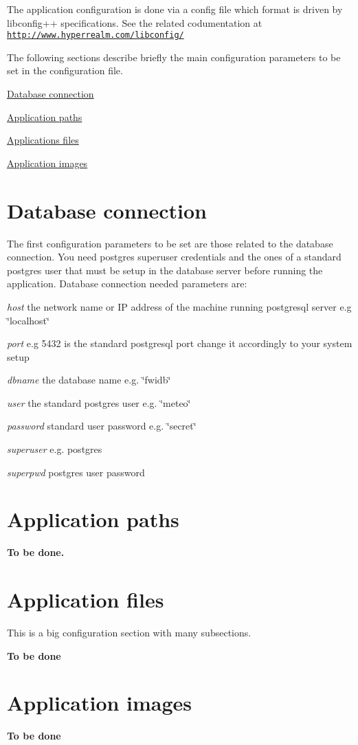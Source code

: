 The application configuration is done via a config file which format is driven by libconfig++ specifications. See the related codumentation at \href{http://www.hyperrealm.com/libconfig/}{\tt http\-://www.\-hyperrealm.\-com/libconfig/}

The following sections describe briefly the main configuration parameters to be set in the configuration file.


\begin{DoxyItemize}
\item \hyperlink{db_connection_config}{Database connection}
\item \hyperlink{application_paths}{Application paths}
\item \hyperlink{application_files}{Applications files}
\item \hyperlink{application_images}{Application images} 
\end{DoxyItemize}\hypertarget{db_connection_config}{}\section{Database connection}\label{db_connection_config}
The first configuration parameters to be set are those related to the database connection. You need postgres superuser credentials and the ones of a standard postgres user that must be setup in the database server before running the application. Database connection needed parameters are\-:


\begin{DoxyItemize}
\item {\itshape host} the network name or I\-P address of the machine running postgresql server e.\-g \char`\"{}localhost\char`\"{} 
\item {\itshape port} e.\-g 5432 is the standard postgresql port change it accordingly to your system setup 
\item {\itshape dbname} the database name e.\-g. \char`\"{}fwidb\char`\"{} 
\item {\itshape user} the standard postgres user e.\-g. \char`\"{}meteo\char`\"{} 
\item {\itshape password} standard user password e.\-g. \char`\"{}secret\char`\"{} 
\item {\itshape superuser} e.\-g. postgres 
\item {\itshape superpwd} postgres user password 
\end{DoxyItemize}\hypertarget{application_paths}{}\section{Application paths}\label{application_paths}
{\bfseries To be done.} \hypertarget{application_files}{}\section{Application files}\label{application_files}
This is a big configuration section with many subsections.

{\bfseries To be done} \hypertarget{application_images}{}\section{Application images}\label{application_images}
{\bfseries To be done} 